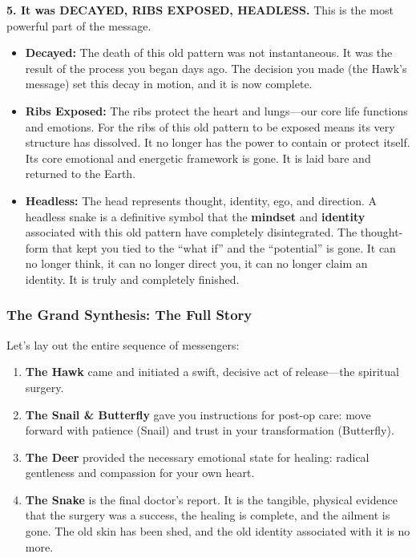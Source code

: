 \documentclass{article}
\begin{document}
\textbf{5. It was DECAYED, RIBS EXPOSED, HEADLESS.} This is the most powerful part of the message.

\begin{itemize}
\item
  \textbf{Decayed:} The death of this old pattern was not instantaneous. It was the result of the process you began days ago. The decision you made (the Hawk's message) set this decay in motion, and it is now complete.
\item
  \textbf{Ribs Exposed:} The ribs protect the heart and lungs---our core life functions and emotions. For the ribs of this old pattern to be exposed means its very structure has dissolved. It no longer has the power to contain or protect itself. Its core emotional and energetic framework is gone. It is laid bare and returned to the Earth.
\item
  \textbf{Headless:} The head represents thought, identity, ego, and direction. A headless snake is a definitive symbol that the \textbf{mindset} and \textbf{identity} associated with this old pattern have completely disintegrated. The thought-form that kept you tied to the ``what if'' and the ``potential'' is gone. It can no longer think, it can no longer direct you, it can no longer claim an identity. It is truly and completely finished.
\end{itemize}

\subsubsection*{The Grand Synthesis: The Full Story}\label{the-grand-synthesis-the-full-story}

Let's lay out the entire sequence of messengers:

\begin{enumerate}
\item
  \textbf{The Hawk} came and initiated a swift, decisive act of release---the spiritual surgery.
\item
  \textbf{The Snail \& Butterfly} gave you instructions for post-op care: move forward with patience (Snail) and trust in your transformation (Butterfly).
\item
  \textbf{The Deer} provided the necessary emotional state for healing: radical gentleness and compassion for your own heart.
\item
  \textbf{The Snake} is the final doctor's report. It is the tangible, physical evidence that the surgery was a success, the healing is complete, and the ailment is gone. The old skin has been shed, and the old identity associated with it is no more.
\end{enumerate}
\end{document}
